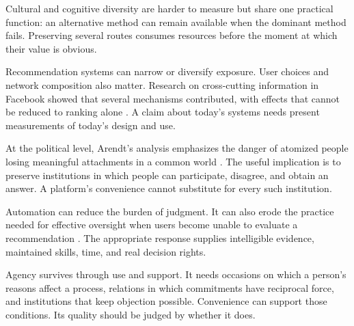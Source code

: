 Cultural and cognitive diversity are harder to measure but share one practical function: an alternative method can remain available when the dominant method fails. Preserving several routes consumes resources before the moment at which their value is obvious.

Recommendation systems can narrow or diversify exposure. User choices and network composition also matter. Research on cross-cutting information in Facebook showed that several mechanisms contributed, with effects that cannot be reduced to ranking alone \cite{bakshy2015exposure}. A claim about today's systems needs present measurements of today's design and use.

At the political level, Arendt's analysis emphasizes the danger of atomized people losing meaningful attachments in a common world \cite{arendt1951origins}. The useful implication is to preserve institutions in which people can participate, disagree, and obtain an answer. A platform's convenience cannot substitute for every such institution.

Automation can reduce the burden of judgment. It can also erode the practice needed for effective oversight when users become unable to evaluate a recommendation \cite{parasuraman1997humans}. The appropriate response supplies intelligible evidence, maintained skills, time, and real decision rights.

Agency survives through use and support. It needs occasions on which a person's reasons affect a process, relations in which commitments have reciprocal force, and institutions that keep objection possible. Convenience can support those conditions. Its quality should be judged by whether it does.
